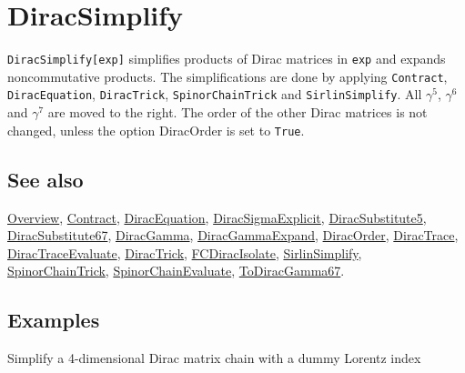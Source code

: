 \documentclass[../FeynCalcManual.tex]{subfiles}
\begin{document}
\hypertarget{diracsimplify}{
\section{DiracSimplify}\label{diracsimplify}}

\texttt{DiracSimplify[\allowbreak{}exp]} simplifies products of Dirac
matrices in \texttt{exp} and expands noncommutative products. The
simplifications are done by applying \texttt{Contract},
\texttt{DiracEquation}, \texttt{DiracTrick}, \texttt{SpinorChainTrick}
and \texttt{SirlinSimplify}. All \(\gamma^5\), \(\gamma^6\) and
\(\gamma^7\) are moved to the right. The order of the other Dirac
matrices is not changed, unless the option DiracOrder is set to
\texttt{True}.

\subsection{See also}

\hyperlink{toc}{Overview}, \hyperlink{contract}{Contract},
\hyperlink{diracequation}{DiracEquation},
\hyperlink{diracsigmaexplicit}{DiracSigmaExplicit},
\hyperlink{diracsubstitute5}{DiracSubstitute5},
\hyperlink{diracsubstitute67}{DiracSubstitute67},
\hyperlink{diracgamma}{DiracGamma},
\hyperlink{diracgammaexpand}{DiracGammaExpand},
\hyperlink{diracorder}{DiracOrder}, \hyperlink{diractrace}{DiracTrace},
\hyperlink{diractraceevaluate}{DiracTraceEvaluate},
\hyperlink{diractrick}{DiracTrick},
\hyperlink{fcdiracisolate}{FCDiracIsolate},
\hyperlink{sirlinsimplify}{SirlinSimplify},
\hyperlink{spinorchaintrick}{SpinorChainTrick},
\hyperlink{spinorchainevaluate}{SpinorChainEvaluate},
\hyperlink{todiracgamma67}{ToDiracGamma67}.

\subsection{Examples}

Simplify a 4-dimensional Dirac matrix chain with a dummy Lorentz index

\begin{Shaded}
\begin{Highlighting}[]
\OperatorTok{[}\SpecialCharTok{\textbackslash{}}\OperatorTok{[}\OperatorTok{],} \SpecialCharTok{\textbackslash{}}\OperatorTok{[}\OperatorTok{],} \SpecialCharTok{\textbackslash{}}\OperatorTok{[}\OperatorTok{]]} 
 
\OperatorTok{[}\SpecialCharTok{\%}\OperatorTok{]}
\end{Highlighting}
\end{Shaded}
\end{document}
